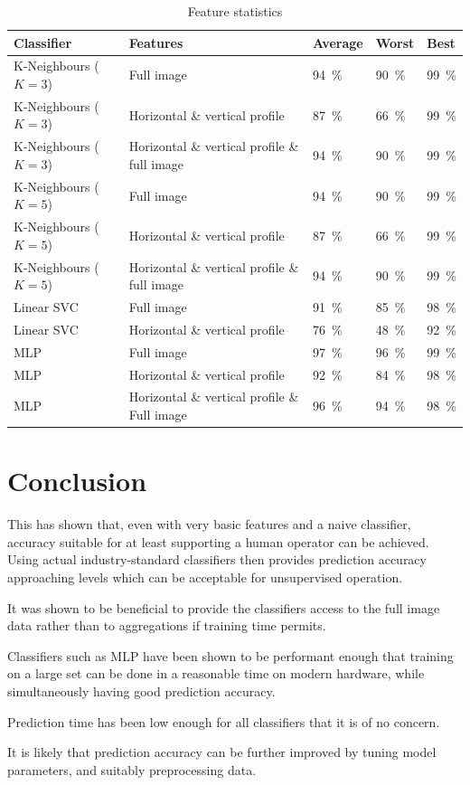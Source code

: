 \documentclass[a4paper]{scrreprt}
\begin{document}
\begin{table}
		\begin{tabular}{lllll}
				\toprule
				Classifier & Features & Average & Worst & Best \\
				\midrule
				K-Neighbours ($K = 3$) & Full image & \SI{94}{\percent} & \SI{90}{\percent} & \SI{99}{\percent} \\
				K-Neighbours ($K = 3$) & Horizontal \& vertical profile & \SI{87}{\percent} & \SI{66}{\percent} & \SI{99}{\percent} \\
				K-Neighbours ($K = 3$) & Horizontal \& vertical profile \& full image & \SI{94}{\percent} & \SI{90}{\percent} & \SI{99}{\percent} \\
				K-Neighbours ($K = 5$) & Full image & \SI{94}{\percent} & \SI{90}{\percent} & \SI{99}{\percent} \\
				K-Neighbours ($K = 5$) & Horizontal \& vertical profile & \SI{87}{\percent} & \SI{66}{\percent} & \SI{99}{\percent} \\
				K-Neighbours ($K = 5$) & Horizontal \& vertical profile \& full image & \SI{94}{\percent} & \SI{90}{\percent} & \SI{99}{\percent} \\
				Linear SVC & Full image & \SI{91}{\percent} & \SI{85}{\percent} & \SI{98}{\percent} \\
				Linear SVC & Horizontal \& vertical profile & \SI{76}{\percent} & \SI{48}{\percent} & \SI{92}{\percent} \\
				MLP & Full image & \SI{97}{\percent} & \SI{96}{\percent} & \SI{99}{\percent} \\
				MLP & Horizontal \& vertical profile & \SI{92}{\percent} & \SI{84}{\percent} & \SI{98}{\percent} \\
				MLP & Horizontal \& vertical profile \& Full image & \SI{96}{\percent} & \SI{94}{\percent} & \SI{98}{\percent} \\
				\bottomrule
		\end{tabular}
		\label{tbl:scikit_accuracy}
		\caption{Feature statistics}
\end{table}

\section{Conclusion}

This has shown that, even with very basic features and a naive classifier,
accuracy suitable for at least supporting a human operator can be achieved.
Using actual industry-standard classifiers then provides prediction accuracy
approaching levels which can be acceptable for unsupervised operation.

It was shown to be beneficial to provide the classifiers access to the full
image data rather than to aggregations if training time permits.

Classifiers such as MLP have been shown to be performant enough that training
on a large set can be done in a reasonable time on modern hardware, while
simultaneously having good prediction accuracy.

Prediction time has been low enough for all classifiers that it is of no
concern.

It is likely that prediction accuracy can be further improved by tuning model
parameters, and suitably preprocessing data.
\end{document}
